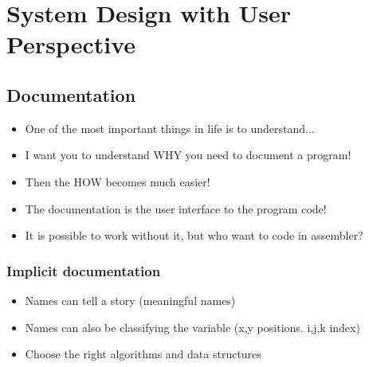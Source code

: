 \chapter{System Design with User Perspective}

\newpage






\section{Documentation}
\begin{itemize}
\item One of the most important things in life is to understand...
\item I want you to understand WHY you need to document a program!
\item Then the HOW becomes much easier!
\end{itemize}

\begin{itemize}
\item The documentation is the user interface to the program code!
\item It is possible to work without it, but who want to code in assembler?
\end{itemize}

\subsection{Implicit documentation}
\begin{itemize}
\item Names can tell a story (meaningful names)
\item Names can also be classifying the variable (x,y positions. i,j,k index)
\item Choose the right algorithms and data structures
\end{itemize}


